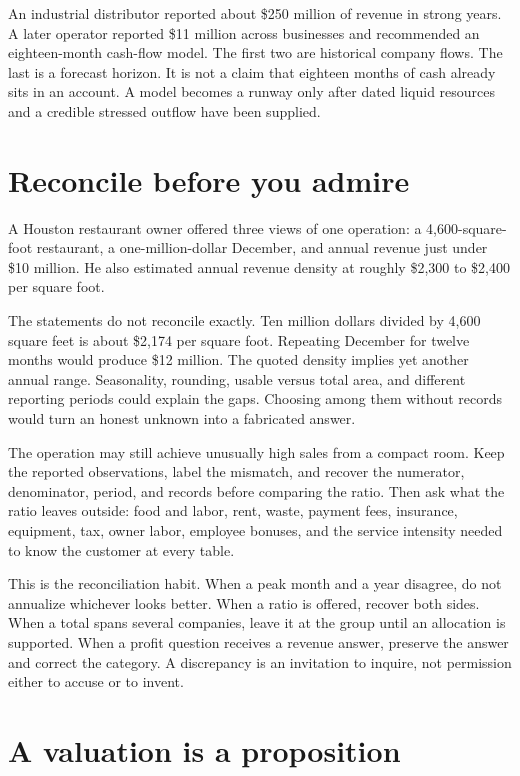 An industrial distributor reported about \$250 million of revenue in strong
years. A later operator reported \$11 million across businesses and recommended
an eighteen-month cash-flow model. The first two are historical company flows.
The last is a forecast horizon. It is not a claim that eighteen months of cash
already sits in an account. A model becomes a runway only after dated liquid
resources and a credible stressed outflow have been supplied.

\section{Reconcile before you admire}

A Houston restaurant owner offered three views of one operation: a
4,600-square-foot restaurant, a one-million-dollar December, and annual revenue
just under \$10 million. He also estimated annual revenue density at roughly
\$2,300 to \$2,400 per square foot.

The statements do not reconcile exactly. Ten million dollars divided by 4,600
square feet is about \$2,174 per square foot. Repeating December for twelve
months would produce \$12 million. The quoted density implies yet another annual
range. Seasonality, rounding, usable versus total area, and different reporting
periods could explain the gaps. Choosing among them without records would turn
an honest unknown into a fabricated answer.

The operation may still achieve unusually high sales from a compact room. Keep
the reported observations, label the mismatch, and recover the numerator,
denominator, period, and records before comparing the ratio. Then ask what the
ratio leaves outside: food and labor, rent, waste, payment fees, insurance,
equipment, tax, owner labor, employee bonuses, and the service intensity needed
to know the customer at every table.

This is the reconciliation habit. When a peak month and a year disagree, do not
annualize whichever looks better. When a ratio is offered, recover both sides.
When a total spans several companies, leave it at the group until an allocation
is supported. When a profit question receives a revenue answer, preserve the
answer and correct the category. A discrepancy is an invitation to inquire, not
permission either to accuse or to invent.

\section{A valuation is a proposition}

